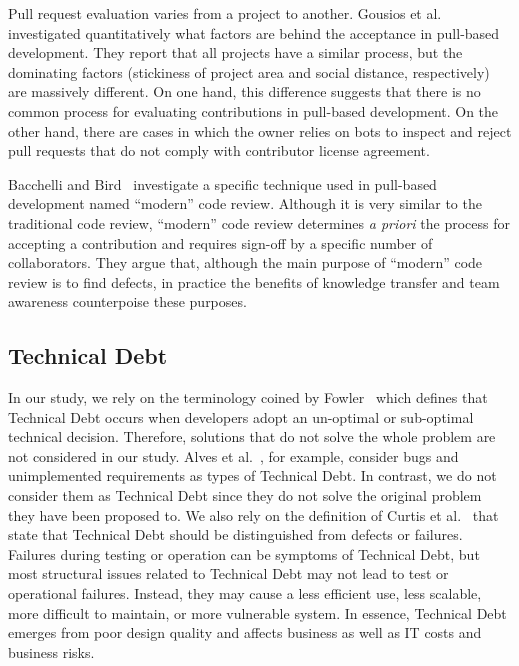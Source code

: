 \documentclass{sig-alternate}
\newcommand{\aspas}[1]{{``#1''}}
\begin{document}
Pull request evaluation varies from a project to another. Gousios et al.~\cite{9} investigated quantitatively what factors are behind the acceptance in pull-based development. They report that all projects have a similar process, but the dominating factors (stickiness of project area and social distance, respectively) are massively different. 
%
On one hand, this difference suggests that there is no common process for evaluating contributions in pull-based development. On the other hand, there are cases in which the owner relies on bots to inspect and reject pull requests that do not comply with contributor license agreement.

Bacchelli and Bird~\cite{2} investigate a specific technique used in pull-based development named \aspas{modern} code review. 
Although it is very similar to the traditional code review,
\aspas{modern} code review determines {\em a priori} the process for accepting a contribution
and requires sign-off by a specific number of collaborators.
They argue that, although the main purpose of \aspas{modern} code review is to find defects, in practice 
the benefits of knowledge transfer and team awareness counterpoise these purposes.

\subsection{Technical Debt}
\label{sec:technical_debt}

In our study, we rely on the terminology coined by Fowler~\cite{7} which defines that
Technical Debt occurs when developers adopt an un-optimal or sub-optimal technical decision. Therefore, solutions that do not solve the whole problem are not considered in our study. 
Alves et al.~\cite{1}, for example, consider bugs and unimplemented requirements as types of Technical Debt. In contrast, we do not consider them as Technical Debt since they do not solve the original problem they have been proposed to. 
%
We also rely on the definition of Curtis et al.~\cite{5} that state that Technical Debt should be distinguished from defects or failures. 
%
Failures during testing or operation can be symptoms of Technical Debt, but most structural issues related to Technical Debt may not lead to test or operational failures. 
%
Instead, they may cause a less efficient use, less scalable, more difficult to maintain, or more vulnerable system. 
%
In essence, Technical Debt emerges from poor design quality and affects business as well as IT costs and business risks. 
\end{document}
